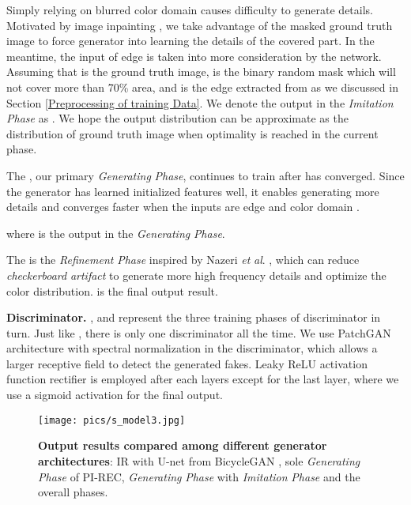 \documentclass[10pt,twocolumn,letterpaper]{article} \usepackage{amsfonts,amssymb}
\begin{document}
Simply relying on blurred color domain causes difficulty to generate details. Motivated by image inpainting \cite{nazeri2019edgeconnect,song2018spg,dupont2018probabilistic}, we take advantage of the masked ground truth image to force generator into learning the details of the covered part. In the meantime, the input of edge is taken into more consideration by the network. Assuming that  is the ground truth image,  is the binary random mask which will not cover more than 70\% area, and  is the edge extracted from  as we discussed in Section \ref{Preprocessing of training Data}. We denote the output in the \emph{Imitation} \emph{Phase} as . We hope the output distribution  can be approximate as the distribution of ground truth image  when optimality is reached in the current phase.


The  , our primary \emph{Generating} \emph{Phase}, continues to train after  has converged. Since the generator has learned initialized features well, it enables generating more details and converges faster when the inputs are edge  and color domain .


where  is the output in the \emph{Generating} \emph{Phase}.

The  is the \emph{Refinement} \emph{Phase} inspired by Nazeri \emph{et} \emph{al}. \cite{nazeri2019edgeconnect}, which can reduce \emph{checkerboard} \emph{artifact} to generate more high frequency details and optimize the color distribution.  is the final output result.


{\bf Discriminator.}
,  and  represent the three training phases of discriminator  in turn. Just like , there is only one discriminator  all the time. We use PatchGAN \cite{isola2017image,yu2018free} architecture with spectral normalization \cite{miyato2018spectral} in the discriminator, which allows a larger receptive field to detect the generated fakes. Leaky ReLU activation function \cite{maas2013rectifier} rectifier is employed after each layers except for the last layer, where we use a sigmoid activation for the final output.
\begin{figure*}[t]
\centering



\texttt{[image: pics/s\_model3.jpg]}

\caption{\textbf{Output results compared among different generator architectures}: IR with U-net \cite{ronneberger2015u} from BicycleGAN \cite{zhu2017toward}, sole \emph{Generating} \emph{Phase} of PI-REC, \emph{Generating} \emph{Phase} with \emph{Imitation} \emph{Phase} and the overall phases.}
\label{Experiment.1}
\end{figure*}
\end{document}
